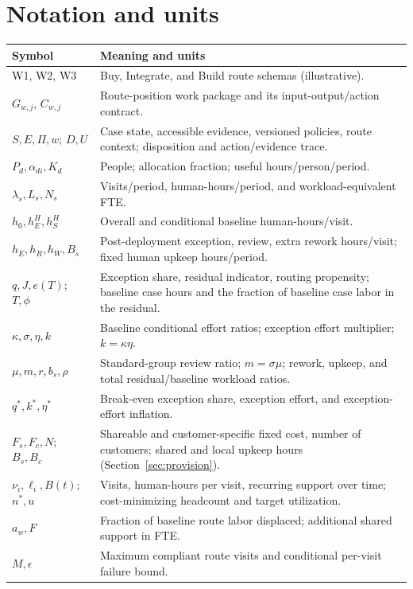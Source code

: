 \section{Notation and units}
\label{app:notation}

\begingroup\footnotesize
\begin{tabularx}{\linewidth}{@{}P{3.7cm}L@{}}
\toprule
Symbol & Meaning and units\\
\midrule
W1, W2, W3 & Buy, Integrate, and Build route schemas (illustrative).\\
$G_{w,j}$, $C_{w,j}$ & Route-position work package and its input-output/action contract.\\
$S,E,\Pi,w$; $D,U$ & Case state, accessible evidence, versioned policies, route context; disposition and action/evidence trace.\\
$P_d,\alpha_{di},K_d$ & People; allocation fraction; useful hours/person/period.\\
$\lambda_s,L_s,N_s$ & Visits/period, human-hours/period, and workload-equivalent FTE.\\
$h_0,h_E^H,h_S^H$ & Overall and conditional baseline human-hours/visit.\\
$h_E,h_R,h_W,B_s$ & Post-deployment exception, review, extra rework hours/visit; fixed human upkeep hours/period.\\
$q,J,e(T)$; $T,\phi$ & Exception share, residual indicator, routing propensity; baseline case hours and the fraction of baseline case labor in the residual.\\
$\kappa,\sigma,\eta,k$ & Baseline conditional effort ratios; exception effort multiplier; $k=\kappa\eta$.\\
$\mu,m,r,b_s,\rho$ & Standard-group review ratio; $m=\sigma\mu$; rework, upkeep, and total residual/baseline workload ratios.\\
$q^{*},k^{*},\eta^{*}$ & Break-even exception share, exception effort, and exception-effort inflation.\\
$F_s,F_c,N$; $B_s,B_c$ & Shareable and customer-specific fixed cost, number of customers; shared and local upkeep hours (Section~\ref{sec:provision}).\\
$\nu_i,\ell_i,B(t)$; $n^{*},u$ & Visits, human-hours per visit, recurring support over time; cost-minimizing headcount and target utilization.\\
$a_w,F$ & Fraction of baseline route labor displaced; additional shared support in FTE.\\
$M,\epsilon$ & Maximum compliant route visits and conditional per-visit failure bound.\\

\end{tabularx}
